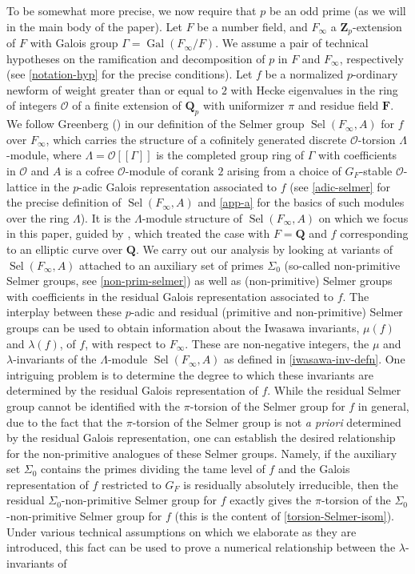 \documentclass[12 pt]{amsart}
\theoremstyle{plain}
\theoremstyle{definition}
\numberwithin{equation}{section}
\numberwithin{table}{section}
\begin{document}
\indent To be somewhat more precise, we now require that $p$ be an odd prime (as we will in the main body of the paper). Let $F$ be a number field, and $F_\infty$ a $\mathbf{Z}_p$-extension of $F$ with Galois group $\Gamma=\operatorname{Gal}(F_\infty/F)$. We assume a pair of technical hypotheses on the ramification and decomposition of $p$ in $F$ and $F_\infty$, respectively (see \cref{notation-hyp} for the precise conditions). Let $f$ be a normalized $p$-ordinary newform of weight greater than or equal to $2$ with Hecke eigenvalues in the ring of integers $\mathscr{O}$ of a finite extension of $\mathbf{Q}_p$ with uniformizer $\pi$ and residue field $\mathbf{F}$. We follow Greenberg (\cite{GR89}) in our definition of the Selmer group $\operatorname{Sel}(F_\infty,A)$ for $f$ over $F_\infty$, which carries the structure of a cofinitely generated discrete $\mathscr{O}$-torsion $\Lambda$-module, where $\Lambda=\mathscr{O}[[\Gamma]]$ is the completed group ring of $\Gamma$ with coefficients in $\mathscr{O}$ and $A$ is a cofree $\mathscr{O}$-module of corank $2$ arising from a choice of $G_F$-stable $\mathscr{O}$-lattice in the $p$-adic Galois representation associated to $f$ (see \cref{adic-selmer} for the precise definition of $\operatorname{Sel}(F_\infty,A)$ and \cref{app-a} for the basics of such modules over the ring $\Lambda$). It is the $\Lambda$-module structure of $\operatorname{Sel}(F_\infty,A)$ on which we focus in this paper, guided by \cite{GV00}, which treated the case with $F=\mathbf{Q}$ and $f$ corresponding to an elliptic curve over $\mathbf{Q}$. We carry out our analysis by looking at variants of $\operatorname{Sel}(F_\infty,A)$ attached to an auxiliary set of primes $\Sigma_0$ (so-called non-primitive Selmer groups, see \cref{non-prim-selmer}) as well as (non-primitive) Selmer groups with coefficients in the residual Galois representation associated to $f$. The interplay between these $p$-adic and residual (primitive and non-primitive) Selmer groups can be used to obtain information about the Iwasawa invariants, $\mu(f)$ and $\lambda(f)$, of $f$, with respect to $F_\infty$. These are non-negative integers, the $\mu$ and $\lambda$-invariants of the $\Lambda$-module $\operatorname{Sel}(F_\infty,A)$ as defined in \cref{iwasawa-inv-defn}. One intriguing problem is to determine the degree to which these invariants are determined by the residual Galois representation of $f$. While the residual Selmer group cannot be identified with the $\pi$-torsion of the Selmer group for $f$ in general, due to the fact that the $\pi$-torsion of the Selmer group is not \emph{a priori} determined by the residual Galois representation, one can establish the desired relationship for the non-primitive analogues of these Selmer groups. Namely, if the auxiliary set $\Sigma_0$ contains the primes dividing the tame level of $f$ and the Galois representation of $f$ restricted to $G_F$ is residually absolutely irreducible, then the residual $\Sigma_0$-non-primitive Selmer group for $f$ exactly gives the $\pi$-torsion of the $\Sigma_0$-non-primitive Selmer group for $f$ (this is the content of \cref{torsion-Selmer-isom}). Under various technical assumptions on which we elaborate as they are introduced, this fact can be used to prove a numerical relationship between the $\lambda$-invariants of 
\end{document}
